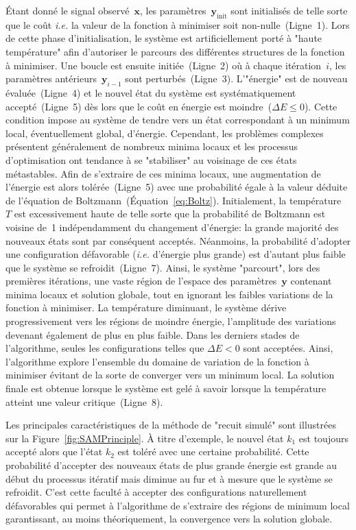 \documentclass[10pt,a4paper,twoside]{report}
\begin{document}
\'Etant donné le signal observé~$\textbf{x}$, les
paramètres~$\textbf{y}_\text{init}$ sont initialisés de telle sorte
que le coût \emph{i.e.} la valeur de la fonction à minimiser soit
non-nulle~(Ligne~1). Lors de cette phase d'initialisation, le système
est artificiellement porté à "haute température" afin d'autoriser le
parcours des différentes structures de la fonction à minimiser. Une
boucle est ensuite initiée~(Ligne~2) où à chaque itération~$i$, les
paramètres antérieurs~$\textbf{y}_{i-1}$ sont
perturbés~(Ligne~3). L'"énergie" est de nouveau évaluée~(Ligne~4) et
le nouvel état du système est systématiquement accepté~(Ligne~5) dès
lors que le coût en énergie est moindre~($\Delta E\leq0$). Cette
condition impose au système de tendre vers un état correspondant à un
minimum local, éventuellement global, d'énergie. Cependant, les
problèmes complexes présentent généralement de nombreux minima locaux
et les processus d'optimisation ont tendance à se "stabiliser" au
voisinage de ces états métastables. Afin de s'extraire de ces minima
locaux, une augmentation de l'énergie est alors tolérée~(Ligne~5) avec
une probabilité égale à la valeur déduite de l'équation de
Boltzmann~(\'Equation~\ref{eq:Boltz}). Initialement, la
température~$T$ est excessivement haute de telle sorte que la
probabilité de Boltzmann est voisine de~1 indépendamment du changement
d'énergie: la grande majorité des nouveaux états sont par conséquent
acceptés. Néanmoins, la probabilité d'adopter une configuration
défavorable (\emph{i.e.} d'énergie plus grande) est d'autant plus
faible que le système se refroidit~(Ligne~7). Ainsi, le système
"parcourt", lors des premières itérations, une vaste région de
l'espace des paramètres~$\textbf{y}$ contenant minima locaux et
solution globale, tout en ignorant les faibles variations de la
fonction à minimiser. La température diminuant, le système dérive
progressivement vers les régions de moindre énergie, l'amplitude des
variations devenant également de plus en plus faible. Dans les
derniers stades de l'algorithme, seules les configurations telles que
$\Delta E<0$ sont acceptées. Ainsi, l'algorithme explore l'ensemble du
domaine de variation de la fonction à minimiser évitant de la sorte de
converger vers un minimum local. La solution finale est obtenue
lorsque le système est gelé à savoir lorsque la température atteint
une valeur critique~(Ligne~8).

Les principales caractéristiques de la méthode de "recuit simulé"
sont illustrées sur la Figure~\ref{fig:SAMPrinciple}. \`A titre
d'exemple, le nouvel état $k_1$ est toujours accepté alors que l'état
$k_2$ est toléré avec une certaine probabilité. Cette probabilité
d'accepter des nouveaux états de plus grande énergie est grande au
début du processus itératif mais diminue au fur et à mesure que le
système se refroidit. C'est cette faculté à accepter des
configurations naturellement défavorables qui permet à l'algorithme de
s'extraire des régions de minimum local garantissant, au moins
théoriquement, la convergence vers la solution globale.
\end{document}
